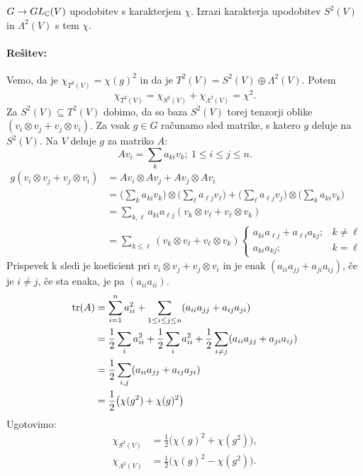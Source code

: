 \begin{zgled}
	$G \to GL_{\mathbb{C}}(V)$ upodobitev s karakterjem $\chi$. Izrazi karakterja upodobitev $S^2(V)$ in $\Lambda^2(V)$ s tem $\chi$.
	
	\paragraph{Re\v sitev:} Vemo, da je $\chi_{T^2(V)} = \chi(g)^2$ in da je $T^2(V) = S^2(V) \oplus \Lambda^2(V)$. Potem
	\[
		\chi_{T^2(V)} = \chi_{S^2(V)} + \chi_{\Lambda^2(V)} = \chi^2.
	\]
	Za $S^2(V) \subseteq T^2(V)$ dobimo, da so baza $S^2(V)$ torej tenzorji oblike $(v_i \otimes v_j + v_j \otimes v_i)$. Za
	vsak $g \in G$ ra\v cunamo sled matrike, s katero $g$ deluje na $S^2(V)$. Na $V$ deluje $g$ za matriko $A$:
	\[
		A v_i  =\sum_k a_{ki} v_k;\ 1 \leq i \leq j \leq n.
	\]
	\begin{align*}
		g(v_i \otimes v_j + v_j \otimes v_i) &= Av_i \otimes Av_j + Av_j \otimes Av_i \\
		&= \Big(\sum_k a_{ki}v_k\Big) \otimes \Big(\sum_\ell a_{\ell j} v_\ell\Big) + \Big(\sum_\ell a_{\ell j} v_j\Big)
			\otimes \Big(\sum_k a_{ki} v_k\Big) \\
		&= \sum_{k, \ell} a_{ki} a_{\ell j} (v_k \otimes v_{\ell} + v_{\ell} \otimes v_k) \\
		&= \sum_{k \leq \ell} (v_k \otimes v_\ell + v_\ell \otimes v_k) \left\{
			\begin{array}{rl}
				a_{ki} a_{\ell j} + a_{\ell i} a_{kj}; & k \neq \ell \\
				a_{ki}a_{kj}; & k = \ell
			\end{array}\right.
	\end{align*}
	Prispevek k sledi je koeficient pri $v_i \otimes v_j + v_j \otimes v_i$ in je enak $(a_{ii} a_{jj} + a_{ji}a_{ij})$, \v ce
	je $i \neq j$, \v ce sta enaka, je pa $(a_{ii} a_{ii})$.
	\begin{align*}
		\operatorname{tr}(A) &= \sum_{i = 1}^n a_{ii}^2 + \sum_{1 \leq i \leq j \leq n} (a_{ii}a_{jj} + a_{ij}a_{ji}) \\
		&= \frac{1}{2}\sum_i a_{ii}^2 + \frac{1}{2}\sum_i a_{ii}^2 + \frac{1}{2}\sum_{i \neq j}(a_{ii}a_{jj} + a_{ji}a_{ij}) \\
		&= \frac{1}{2}\sum_{i,j}(a_{ii}a_{jj} + a_{ij}a_{ji}) \\
		&= \frac{1}{2}\big(\chi(g^2) + \chi(g)^2\big)
	\end{align*}
	Ugotovimo:
	\begin{align*}
		\chi_{S^2(V)} &= \frac{1}{2}\big(\chi(g)^2 + \chi(g^2)\big), \\
		\chi_{\Lambda^2(V)} &= \frac{1}{2}\big(\chi(g)^2 - \chi(g^2)\big).
	\end{align*}
\end{zgled}

